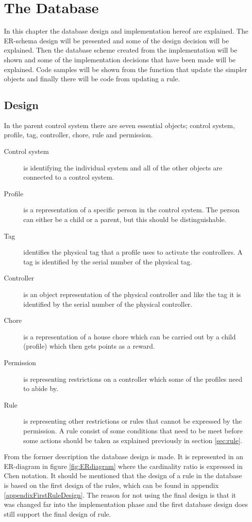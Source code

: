 \chapter{The Database}
\label{chap:database} 
In this chapter the database design and implementation hereof are explained. The ER-schema design will be presented and some of the design decision will be explained. Then the database scheme created from the implementation will be shown and some of the implementation decisions that have been made will be explained. Code samples will be shown from the function that update the simpler objects and finally there will be code from updating a rule.  
  
\section{Design}
\label{sec:DBdesign}
In the parent control system there are seven essential objects; control system, profile, tag, controller, chore, rule and permission. 

\begin{description}
	\item[Control system] is identifying the individual system and all of the other objects are connected to a control system.
	\item[Profile] is a representation of a specific person in the control system. The person can either be a child or a parent, but this should be distinguishable.
	\item[Tag] identifies the physical tag that a profile uses to activate the controllers. A tag is identified by the serial number of the physical tag.
	\item[Controller]	is an object representation of the physical controller and like the tag it is identified by the serial number of the physical controller.
	\item[Chore] is a representation of a house chore which can be carried out by a child (profile) which then gets points as a reward.
	\item[Permission] is representing restrictions on a controller which some of the profiles need to abide by. 
	\item[Rule] is representing other restrictions or rules that cannot be expressed by the permission. A rule consist of some conditions that need to be meet before some actions should be taken as explained previously in section \vref{sec:rule}. 
\end{description}

From the former description the database design is made. It is represented in an ER-diagram in figure \ref{fig:ERdiagram} where the cardinality ratio is expressed in Chen notation\citep{DatabaseKilde}. It should be mentioned that the design of a rule in the database is based on the first design of the rules, which can be found in appendix \vref{appendixFirstRuleDesign}. The reason for not using the final design is that it was changed far into the implementation phase and the first database design does still support the final design of rule. 

